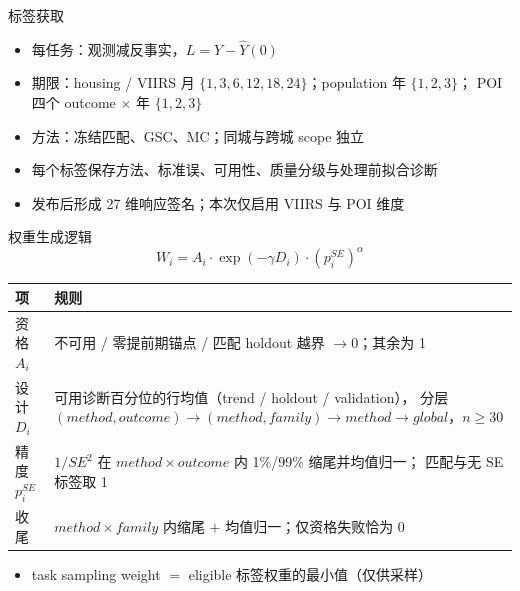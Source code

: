 \documentclass[aspectratio=169,11pt]{beamer}
\begin{document}
\begin{frame}{标签获取}
  \small
  \begin{itemize}
    \item 每任务：观测减反事实，$L=Y-\hat Y(0)$
    \item 期限：housing / VIIRS 月 $\{1,3,6,12,18,24\}$；population 年 $\{1,2,3\}$；
      POI 四个 outcome $\times$ 年 $\{1,2,3\}$
    \item 方法：冻结匹配、GSC、MC；同城与跨城 scope 独立
    \item 每个标签保存方法、标准误、可用性、质量分级与处理前拟合诊断
    \item 发布后形成 27 维响应签名；本次仅启用 VIIRS 与 POI 维度
  \end{itemize}
\end{frame}

\begin{frame}{权重生成逻辑}
  \small
  \[
    W_i=A_i\cdot\exp(-\gamma D_i)\cdot(p_i^{SE})^{\alpha}
  \]
  \begin{tabular}{p{}p{}}
    \toprule
    项 & 规则 \\
    \midrule
    资格 $A_i$ & 不可用 / 零提前期锚点 / 匹配 holdout 越界 $\rightarrow 0$；其余为 1 \\
    设计 $D_i$ & 可用诊断百分位的行均值（trend / holdout / validation），
      分层 $(method,outcome)\to(method,family)\to method\to global$，$n\ge30$ \\
    精度 $p_i^{SE}$ & $1/SE^2$ 在 $method\times outcome$ 内 1\%/99\% 缩尾并均值归一；
      匹配与无 SE 标签取 1 \\
    收尾 & $method\times family$ 内缩尾 $+$ 均值归一；仅资格失败恰为 0 \\
    \bottomrule
  \end{tabular}
  \medskip
  \begin{itemize}
    \item task sampling weight $=$ eligible 标签权重的最小值（仅供采样）
  \end{itemize}
\end{frame}
\end{document}
